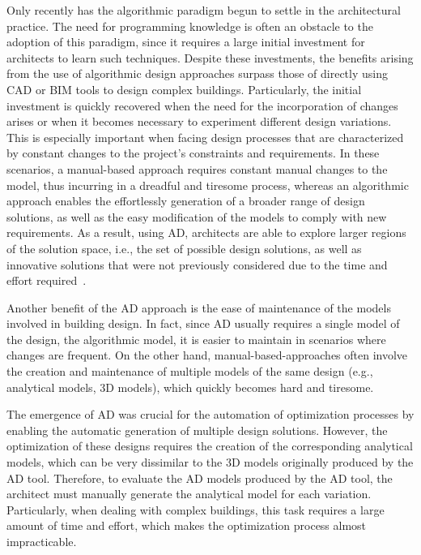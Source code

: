 Only recently has the algorithmic paradigm begun to settle in the architectural practice. The need for programming knowledge is often an obstacle to the adoption of this paradigm, since it requires a large initial investment for architects to learn such techniques. Despite these investments, the benefits arising from the use of algorithmic design approaches surpass those of directly using \ac{CAD} or \ac{BIM} tools to design complex buildings. Particularly, the initial investment is quickly recovered when the need for the incorporation of changes arises or when it becomes necessary to experiment different design variations. This is especially important when facing design processes that are characterized by constant changes to the project's constraints and requirements. In these scenarios, a manual-based approach requires constant manual changes to the model, thus incurring in a dreadful and tiresome process, whereas an algorithmic approach enables the effortlessly generation of a broader range of design solutions, as well as the easy modification of the models to comply with new requirements. As a result, using \ac{AD}, architects are able to explore larger regions of the solution space, i.e., the set of possible design solutions, as well as innovative solutions that were not previously considered due to the time and effort required~\cite{Leitao2014GD}.

Another benefit of the \ac{AD} approach is the ease of maintenance of the models involved in building design. In fact, since \ac{AD} usually requires a single model of the design, the algorithmic model, it is easier to maintain in scenarios where changes are frequent. On the other hand, manual-based-approaches often involve the creation and maintenance of multiple models of the same design (e.g., analytical models, 3D models), which quickly becomes hard and tiresome.

The emergence of \ac{AD} was crucial for the automation of optimization processes by enabling the automatic generation of multiple design solutions. However, the optimization of these designs requires the creation of the corresponding analytical models, which can be very dissimilar to the 3D models originally produced by the \ac{AD} tool. Therefore, to evaluate the \ac{AD} models produced by the \ac{AD} tool, the architect must manually generate the analytical model for each variation. Particularly, when dealing with complex buildings, this task requires a large amount of time and effort, which makes the optimization process almost impracticable.

